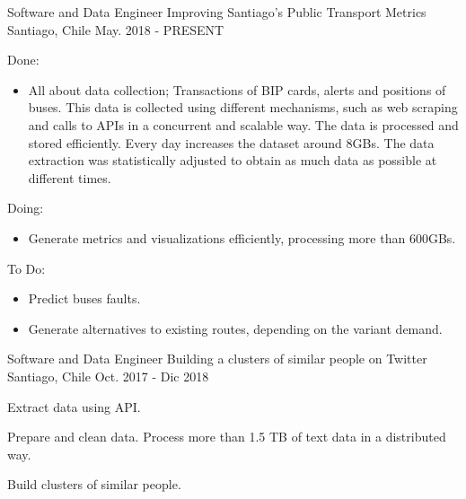 

\begin{cventries}

  \cventry
    {Software and Data Engineer} %
    {Improving Santiago's Public Transport Metrics} %
    {Santiago, Chile} %
    {May. 2018 - PRESENT} %
    {
      \begin{cvitems} %
        \item {Done:}
      	\begin{itemize}
      		\item {All about data collection; Transactions of BIP cards, alerts and positions of buses. This data is collected using different mechanisms, such as web scraping and calls to APIs in a concurrent and scalable way. The data is processed and stored efficiently. Every day increases the dataset around 8GBs. The data extraction was statistically adjusted to obtain as much data as possible at different times.}
      	\end{itemize}
      	\item {Doing:}
      	\begin{itemize}
        	\item {Generate metrics and visualizations efficiently, processing more than 600GBs.}
      	\end{itemize}
      	\item {To Do:}
      	\begin{itemize}
        	\item {Predict buses faults.}
	        \item {Generate alternatives to existing routes, depending on the variant demand.}
      	\end{itemize}
      \end{cvitems}
    }

  \cventry
    {Software and Data Engineer} %
    {Building a clusters of similar people on Twitter} %
    {Santiago, Chile} %
    {Oct. 2017 - Dic 2018} %
    {
      \begin{cvitems} %
		\item {Extract data using API.}        
        \item {Prepare and clean data. Process more than 1.5 TB of text data in a distributed way.}
        \item {Build clusters of similar people.}
      \end{cvitems}
    }

\end{cventries}
